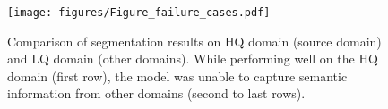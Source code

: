 \begin{figure}[!t]
\centering
\texttt{[image: figures/Figure\_failure\_cases.pdf]}
\caption{
    Comparison of segmentation results on HQ domain (source domain) and LQ domain (other domains). 
    While performing well on the HQ domain (first row), the model was unable to capture semantic information from other domains (second to last rows). 
}
\label{fig:fig_1}
\end{figure}